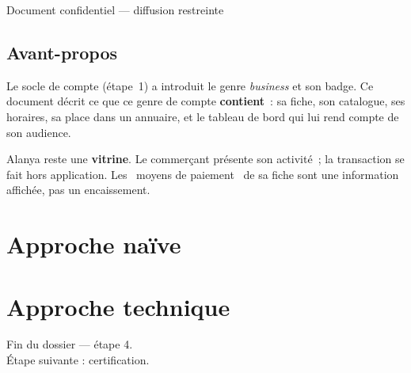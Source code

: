 \documentclass[11pt,a4paper,oneside]{report}
\begin{document}
\begin{titlepage}
\vspace{0.8cm}
\begin{center}\color{AlanyaGray}\small\sffamily
  Document confidentiel --- diffusion restreinte
\end{center}
\end{titlepage}

\chapter*{Avant-propos}
\thispagestyle{plain}

Le socle de compte (étape~1) a introduit le genre \emph{business} et son badge. Ce document
décrit ce que ce genre de compte \textbf{contient}~: sa fiche, son catalogue, ses horaires,
sa place dans un annuaire, et le tableau de bord qui lui rend compte de son audience.

\begin{note}
Alanya reste une \textbf{vitrine}. Le commerçant présente son activité~; la transaction se
fait hors application. Les \guillemotleft~moyens de paiement~\guillemotright{} de sa fiche
sont une information affichée, pas un encaissement.
\end{note}

\tableofcontents

\part{Approche naïve}



\part{Approche technique}



\vfill
\begin{center}\small\color{AlanyaGray}\sffamily
Fin du dossier --- étape 4. \\
Étape suivante : certification.
\end{center}
\end{document}
